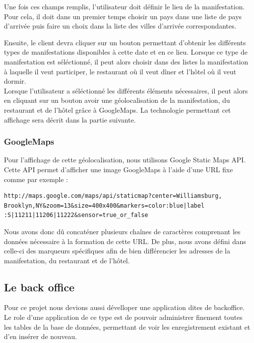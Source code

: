 \documentclass[11pt,a4paper]{article}
\begin{document}
Une fois ces champs remplis, l'utilisateur doit définir le lieu de la
manifestation. Pour cela, il doit dans un premier temps choisir un pays dans une
liste de pays d'arrivée puis faire un choix dans la liste des villes d'arrivée
correspondantes.

Ensuite, le client devra cliquer sur un bouton permettant d'obtenir les
différents types de manifestations disponibles à cette date et en ce lieu.
Lorsque ce type de manifestation est séléctionné, il peut alors choisir dans des
listes la manifestation à laquelle il veut participer, le restaurant où il veut
dîner et l'hôtel où il veut dormir.\\

Lorsque l'utilisateur a séléctionné les différents éléments nécessaires, il
peut alors en cliquant sur un bouton avoir une géolocalisation de la
manifestation, du restaurant et de l'hôtel grâce à GoogleMaps. La technologie
permettant cet affichage sera décrit dans la partie suivante.

\subsubsection{GoogleMaps}
Pour l'affichage de cette géolocalisation, nous utilisons Google Static Maps
API. Cette API permet d'afficher une image GoogleMaps à l'aide d'une URL fixe
comme par exemple :\\
\begin{verbatim}
http://maps.google.com/maps/api/staticmap?center=Williamsburg,
Brooklyn,NY&zoom=13&size=400x400&markers=color:blue|label
:S|11211|11206|11222&sensor=true_or_false
\end{verbatim}

Nous avons donc dû concaténer plusieurs chaînes de caractères comprenant les
données nécessaire à la formation de cette URL. De plus, nous avons défini dans
celle-ci des marqueurs spécifiques afin de bien différencier les adresses de la
manifestation, du restaurant et de l'hôtel.

\subsection{Le back office}

Pour ce projet nous devions aussi dévelloper une application dites de
backoffice. Le role d'une application de ce type est de pouvoir administrer
finement toutes les tables de la base de données, permettant de voir les
enregistrement existant et d'en insérer de nouveau.
\end{document}
